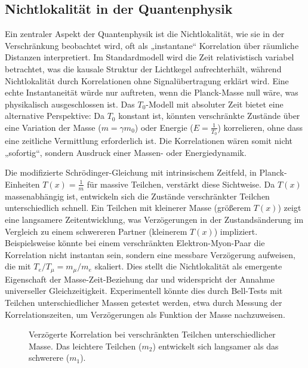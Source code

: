 \documentclass[a4paper,12pt]{article}
\newcommand{\Tfield}{T(x)}
\begin{document}
	\subsection{Nichtlokalität in der Quantenphysik}
	Ein zentraler Aspekt der Quantenphysik ist die Nichtlokalität, wie sie in der Verschränkung beobachtet wird, oft als „instantane“ Korrelation über räumliche Distanzen interpretiert. Im Standardmodell wird die Zeit relativistisch variabel betrachtet, was die kausale Struktur der Lichtkegel aufrechterhält, während Nichtlokalität durch Korrelationen ohne Signalübertragung erklärt wird. Eine echte Instantaneität würde nur auftreten, wenn die Planck-Masse null wäre, was physikalisch ausgeschlossen ist. Das \( T_0 \)-Modell mit absoluter Zeit bietet eine alternative Perspektive: Da \( T_0 \) konstant ist, könnten verschränkte Zustände über eine Variation der Masse (\( m = \gamma m_0 \)) oder Energie (\( E = \frac{1}{T_0} \)) korrelieren, ohne dass eine zeitliche Vermittlung erforderlich ist. Die Korrelationen wären somit nicht „sofortig“, sondern Ausdruck einer Massen- oder Energiedynamik.
	
	Die modifizierte Schrödinger-Gleichung mit intrinsischem Zeitfeld, in Planck-Einheiten \(\Tfield = \frac{1}{m}\) für massive Teilchen, verstärkt diese Sichtweise. Da \(\Tfield\) massenabhängig ist, entwickeln sich die Zustände verschränkter Teilchen unterschiedlich schnell. Ein Teilchen mit kleinerer Masse (größerem \(\Tfield\)) zeigt eine langsamere Zeitentwicklung, was Verzögerungen in der Zustandsänderung im Vergleich zu einem schwereren Partner (kleinerem \(\Tfield\)) impliziert. Beispielsweise könnte bei einem verschränkten Elektron-Myon-Paar die Korrelation nicht instantan sein, sondern eine messbare Verzögerung aufweisen, die mit \( T_e / T_\mu = m_\mu / m_e \) skaliert. Dies stellt die Nichtlokalität als emergente Eigenschaft der Masse-Zeit-Beziehung dar und widerspricht der Annahme universeller Gleichzeitigkeit. Experimentell könnte dies durch Bell-Tests mit Teilchen unterschiedlicher Massen getestet werden, etwa durch Messung der Korrelationszeiten, um Verzögerungen als Funktion der Masse nachzuweisen.
	
	\begin{figure}[h]
		\centering
		\caption{Verzögerte Korrelation bei verschränkten Teilchen unterschiedlicher Masse. Das leichtere Teilchen (\(m_2\)) entwickelt sich langsamer als das schwerere (\(m_1\)).}
	\end{figure}
	
\end{document}
